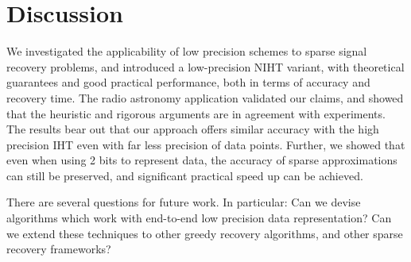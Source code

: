 \documentclass{article}
\begin{document}
\section{Discussion}\label{section_discussion}
We investigated the applicability of low precision schemes to sparse signal recovery problems, and introduced a low-precision NIHT variant, with theoretical guarantees and good practical performance, both in terms of accuracy and recovery time. 
The radio astronomy application validated our claims, and showed that the heuristic and rigorous arguments are in agreement with experiments. The results bear out that our approach offers similar accuracy with the high precision IHT even with far less precision of data points. Further, we showed that even when using 2 bits to represent data,  the accuracy of sparse approximations can still be preserved, and significant practical speed up can be achieved.

There are several questions for future work. In particular: Can we devise algorithms which work with end-to-end low precision data representation? Can we extend these techniques to other greedy recovery algorithms, and other sparse recovery frameworks?


\end{document}
